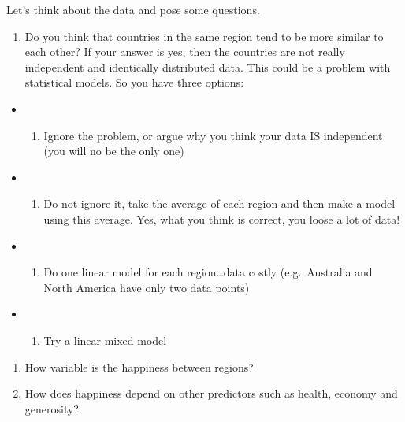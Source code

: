 \documentclass[
]{book}
\providecommand{\tightlist}{%
  \setlength{\itemsep}{0pt}\setlength{\parskip}{0pt}}
\theoremstyle{definition}
\theoremstyle{definition}
\theoremstyle{definition}
\theoremstyle{definition}
\theoremstyle{remark}
\begin{document}
Let's think about the data and pose some questions.

\begin{enumerate}
\def\labelenumi{\Alph{enumi})}
\tightlist
\item
  Do you think that countries in the same region tend to be more similar to each other?
  If your answer is yes, then the countries are not really independent and identically distributed data. This could be a problem with statistical models. So you have three options:
\end{enumerate}

\begin{itemize}
\item
  \begin{enumerate}
  \def\labelenumi{\arabic{enumi}.}
  \tightlist
  \item
    Ignore the problem, or argue why you think your data IS independent (you will no be the only one)
  \end{enumerate}
\item
  \begin{enumerate}
  \def\labelenumi{\arabic{enumi}.}
  \setcounter{enumi}{1}
  \tightlist
  \item
    Do not ignore it, take the average of each region and then make a model using this average. Yes, what you think is correct, you loose a lot of data!
  \end{enumerate}
\item
  \begin{enumerate}
  \def\labelenumi{\arabic{enumi}.}
  \setcounter{enumi}{2}
  \tightlist
  \item
    Do one linear model for each region\ldots data costly (e.g.~Australia and North America have only two data points)
  \end{enumerate}
\item
  \begin{enumerate}
  \def\labelenumi{\arabic{enumi}.}
  \setcounter{enumi}{3}
  \tightlist
  \item
    Try a linear mixed model
  \end{enumerate}
\end{itemize}

\begin{enumerate}
\def\labelenumi{\Alph{enumi})}
\setcounter{enumi}{1}
\item
  How variable is the happiness between regions?
\item
  How does happiness depend on other predictors such as health, economy and generosity?
\end{enumerate}
\end{document}
